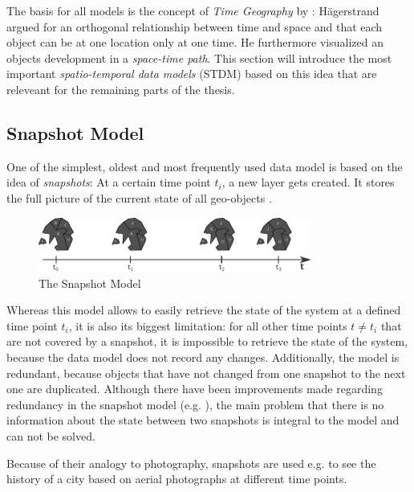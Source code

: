 The basis for all models is the concept of \emph{Time Geography} by
\cite{haegerstrand1970}: Hägerstrand argued for an orthogonal relationship between time and space and that each object can be at one location only at one time. He furthermore visualized an objects development in a \emph{space-time path}. This section will introduce the most important \emph{spatio-temporal data models} (STDM) based on this idea that are releveant for the remaining parts of the thesis.


\subsection{Snapshot Model} %
\label{sub:snapshot_model}

One of the simplest, oldest and most frequently used data model is based on the idea of \emph{snapshots}: At a certain time point $t_i$, a new layer gets created. It stores the full picture of the current state of all geo-objects
\cite{Langran1988frameworktgis}.

\begin{figure}[H]
  \centering
  \includegraphics[width=0.8\textwidth]{graphics/basics/stdm/snapshot_model}
  \caption{The Snapshot Model}
  \label{fig:snapshot_model}
\end{figure}

Whereas this model allows to easily retrieve the state of the system at a defined time point $t_i$, it is also its biggest limitation: for all other time points $t \neq t_i$ that are not covered by a snapshot, it is impossible to retrieve the state of the system, because the data model does not record any changes. Additionally, the model is redundant, because objects that have not changed from one snapshot to the next one are duplicated. Although there have been improvements made regarding redundancy in the snapshot model (e.g. \cite{armenakis92}), the main problem that there is no information about the state between two snapshots is integral to the model and can not be solved.

Because of their analogy to photography, snapshots are used e.g. to see the history of a city based on aerial photographs at different time points.

